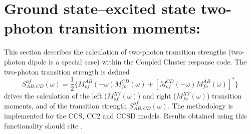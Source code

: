 
\section{Ground state--excited state two-photon transition moments:
} \label{sec:ccsm}

This section describes the calculation of 
two-photon transition strengths 
(two-photon dipole is a special case) 
within the Coupled Cluster response code.
The two-photon transition strength is defined
\[
S^{of}_{AB,CD}(\omega) = \frac{1}{2} \{ M^{AB}_{of}(-\omega) M^{CD}_{fo}(\omega)
                         +[M^{CD}_{of}(-\omega) M^{AB}_{fo}(\omega)]^\ast\}
\]
 drives the calculation of the left ($M^{XY}_{of}(\omega)$)
and right ($M^{XY}_{fo}(\omega)$) transition moments, and of the transition 
strength $S^{of}_{AB,CD}(\omega)$.
The methodology is implemented for the CCS, CC2 and CCSD models.
Results obtained using this functionality should cite 
\cite{Haettig:MULTIPHOTON,Haettig:TWOPHOTON}.
